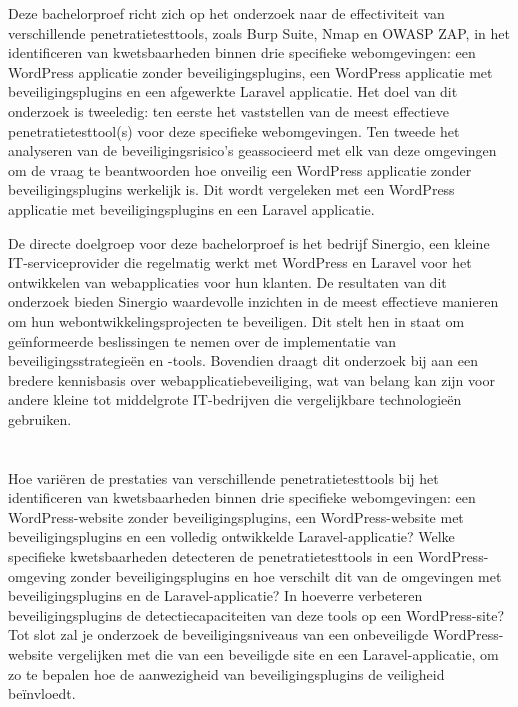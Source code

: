 Deze bachelorproef richt zich op het onderzoek naar de effectiviteit van verschillende penetratietesttools, zoals Burp Suite, Nmap en OWASP ZAP, 
in het identificeren van kwetsbaarheden binnen drie specifieke webomgevingen: een WordPress applicatie zonder beveiligingsplugins,
een WordPress applicatie met beveiligingsplugins en een afgewerkte Laravel applicatie. Het doel van dit onderzoek is tweeledig: 
ten eerste het vaststellen van de meest effectieve penetratietesttool(s) voor deze specifieke webomgevingen. Ten tweede het 
analyseren van de beveiligingsrisico's geassocieerd met elk van deze omgevingen om de vraag te beantwoorden hoe onveilig een 
WordPress applicatie zonder beveiligingsplugins werkelijk is. Dit wordt vergeleken met een WordPress applicatie met 
beveiligingsplugins en een Laravel applicatie.

De directe doelgroep voor deze bachelorproef is het bedrijf Sinergio, een kleine IT-serviceprovider die regelmatig 
werkt met WordPress en Laravel voor het ontwikkelen van webapplicaties voor hun klanten. De resultaten van dit 
onderzoek bieden Sinergio waardevolle inzichten in de meest effectieve manieren om hun webontwikkelingsprojecten 
te beveiligen. Dit stelt hen in staat om geïnformeerde beslissingen te nemen over de implementatie van 
beveiligingsstrategieën en -tools. Bovendien draagt dit onderzoek bij aan een bredere kennisbasis over webapplicatiebeveiliging, 
wat van belang kan zijn voor andere kleine tot middelgrote IT-bedrijven die vergelijkbare technologieën gebruiken.

\section{}%
\label{sec:onderzoeksvraag}
Hoe variëren de prestaties van verschillende penetratietesttools bij het identificeren van kwetsbaarheden binnen drie 
specifieke webomgevingen: een WordPress-website zonder beveiligingsplugins, een WordPress-website met beveiligingsplugins 
en een volledig ontwikkelde Laravel-applicatie? Welke specifieke kwetsbaarheden detecteren de penetratietesttools in een WordPress-omgeving zonder 
beveiligingsplugins en hoe verschilt dit van de omgevingen met beveiligingsplugins en de Laravel-applicatie? 
In hoeverre verbeteren beveiligingsplugins de detectiecapaciteiten van deze tools op een WordPress-site? 
Tot slot zal je onderzoek de beveiligingsniveaus van een onbeveiligde WordPress-website vergelijken met die 
van een beveiligde site en een Laravel-applicatie, om zo te bepalen hoe de aanwezigheid van beveiligingsplugins de 
veiligheid beïnvloedt.


